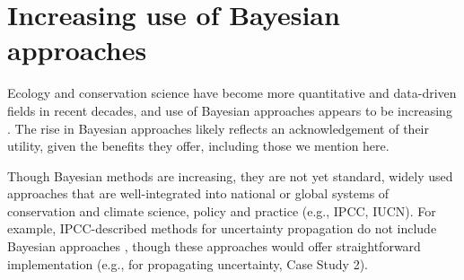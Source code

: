 \documentclass{article}
\begin{document}
\section* {Increasing use of Bayesian approaches}
\par Ecology and conservation science have become more quantitative and data-driven fields in recent decades, and use of Bayesian approaches appears to be increasing \citep{anderson2021trends}. The rise in Bayesian approaches likely reflects an acknowledgement of their utility, given the benefits they offer, including those we mention here. 
\par Though Bayesian methods are increasing, they are not yet standard, widely used approaches that are well-integrated into national or global systems of conservation and climate science, policy and practice (e.g., IPCC, IUCN). For example, IPCC-described methods for uncertainty propagation do not include Bayesian approaches \citep{ipcc2007}, though these approaches would offer straightforward implementation (e.g., for propagating uncertainty, Case Study 2). %
\end{document}

